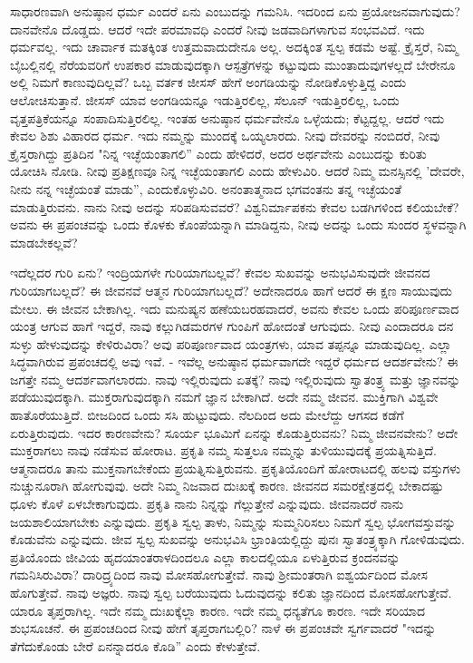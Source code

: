 ಸಾಧಾರಣವಾಗಿ ಅನುಷ್ಠಾನ ಧರ್ಮ ಎಂದರೆ ಏನು ಎಂಬುದನ್ನು ಗಮನಿಸಿ. ಇದರಿಂದ ಏನು ಪ್ರಯೋಜನವಾಗುವುದು? ದಾನವೇನೊ ದೊಡ್ಡದು. ಆದರೆ ಇದೇ ಪರಮಾವಧಿ ಎಂದರೆ ನೀವು ಜಡವಾದಿಗಳಾಗುವ ಸಂಭವವಿದೆ. ಇದು ಧರ್ಮವಲ್ಲ. ಇದು ಚಾರ್ವಾಕ ಮತಕ್ಕಿಂತ ಉತ್ತಮವಾದುದೇನೂ ಅಲ್ಲ. ಅದಕ್ಕಿಂತ ಸ್ವಲ್ಪ ಕಡಮೆ ಅಷ್ಟೆ. ಕ್ರೈಸ್ತರೆ, ನಿಮ್ಮ ಬೈಬಲ್ಲಿನಲ್ಲಿ ನೆರೆಯವರಿಗೆ ಉಪಕಾರ ಮಾಡುವುದಕ್ಕಾಗಿ ಆಸ್ಪತ್ರೆಗಳನ್ನು ಕಟ್ಟುವುದು ಮುಂತಾದುವುಗಳಲ್ಲದೆ ಬೇರೇನೂ ಅಲ್ಲಿ ನಿಮಗೆ ಕಾಣುವುದಿಲ್ಲವೆ? ಒಬ್ಬ ವರ್ತಕ ಜೀಸಸ್ ಹೇಗೆ ಅಂಗಡಿಯನ್ನು ನೋಡಿಕೊಳ್ಳುತ್ತಿದ್ದ ಎಂದು ಆಲೋಚಿಸುತ್ತಾನೆ. ಜೀಸಸ್ ಯಾವ ಅಂಗಡಿಯನ್ನೂ ಇಡುತ್ತಿರಲಿಲ್ಲ, ಸೆಲೂನ್ ಇಡುತ್ತಿರಲಿಲ್ಲ, ಒಂದು ವೃತ್ತಪತ್ರಿಕೆಯನ್ನೂ ಸಂಪಾದಿಸುತ್ತಿರಲಿಲ್ಲ. ಇಂತಹ ಅನುಷ್ಠಾನ ಧರ್ಮವೇನೊ ಒಳ್ಳೆಯದು; ಕೆಟ್ಟದ್ದಲ್ಲ. ಆದರೆ ಇದು ಕೇವಲ ಶಿಶು ವಿಹಾರದ ಧರ್ಮ. ಇದು ನಮ್ಮನ್ನು ಮುಂದಕ್ಕೆ ಒಯ್ಯಲಾರದು. ನೀವು ದೇವರನ್ನು ನಂಬಿದರೆ, ನೀವು ಕ್ರೈಸ್ತರಾಗಿದ್ದು ಪ್ರತಿದಿನ "ನಿನ್ನ ಇಚ್ಛೆಯಂತಾಗಲಿ” ಎಂದು ಹೇಳಿದರೆ, ಅದರ ಅರ್ಥವೇನು ಎಂಬುದನ್ನು ಕುರಿತು ಯೋಚಿಸಿ ನೋಡಿ. ನೀವು ಪ್ರತಿಕ್ಷಣವೂ ನಿನ್ನ ಇಚ್ಛೆಯಂತಾಗಲಿ ಎಂದು ಹೇಳುವಿರಿ. ಆದರೆ ನಿಮ್ಮ ಮನಸ್ಸಿನಲ್ಲಿ 'ದೇವರೇ, ನೀನು ನನ್ನ ಇಚ್ಛೆಯಂತೆ ಮಾಡು'', ಎಂದುಕೊಳ್ಳುವಿರಿ. ಅನಂತಾತ್ಮನಾದ ಭಗವಂತನು ತನ್ನ ಇಚ್ಛೆಯಂತೆ ಮಾಡುತ್ತಿರುವನು. ನಾನು ನೀವು ಅದನ್ನು ಸರಿಪಡಿಸುವವರೆ? ವಿಶ್ವನಿರ್ಮಾಪಕನು ಕೇವಲ ಬಡಗಿಗಳಿಂದ ಕಲಿಯಬೇಕೆ? ಅವನು ಈ ಪ್ರಪಂಚವನ್ನು ಒಂದು ಕೊಳಕು ಕೊಂಪೆಯನ್ನಾಗಿ ಮಾಡಿದ್ದನು, ನೀವು ಅದನ್ನು ಒಂದು ಸುಂದರ ಸ್ಥಳವನ್ನಾಗಿ ಮಾಡಬೇಕಲ್ಲವೆ?

ಇದೆಲ್ಲದರ ಗುರಿ ಏನು? ಇಂದ್ರಿಯಗಳೇ ಗುರಿಯಾಗಬಲ್ಲವೆ? ಕೇವಲ ಸುಖವನ್ನು ಅನುಭವಿಸುವುದೇ ಜೀವನದ ಗುರಿಯಾಗಬಲ್ಲದೆ? ಈ ಜೀವನವೆ ಆತ್ಮನ ಗುರಿಯಾಗಬಲ್ಲದೆ? ಅದೇನಾದರೂ ಹಾಗೆ ಆದರೆ ಈ ಕ್ಷಣ ಸಾಯುವುದು ಮೇಲು. ಈ ಜೀವನ ಬೇಕಾಗಿಲ್ಲ. ಇದು ಮನುಷ್ಯನ ಹಣೆಯಬರಹವಾದರೆ, ಅವನು ಕೇವಲ ಒಂದು ಪರಿಪೂರ್ಣವಾದ ಯಂತ್ರ ಆಗುವ ಹಾಗೆ ಇದ್ದರೆ, ನಾವು ಕಲ್ಲುಗಿಡಮರಗಳ ಗುಂಪಿಗೆ ಹೋದಂತೆ ಆಗುವುದು. ನೀವು ಎಂದಾದರೂ ದನ ಸುಳ್ಳು ಹೇಳುವುದನ್ನು ಕೇಳಿರುವಿರಾ? ಅವು ಪರಿಪೂರ್ಣವಾದ ಯಂತ್ರಗಳು, ಯಾವ ತಪ್ಪನ್ನೂ ಮಾಡುವುದಿಲ್ಲ. ಎಲ್ಲಾ ಸಿದ್ಧವಾಗಿರುವ ಪ್ರಪಂಚದಲ್ಲಿ ಅವು ಇವೆ. - ಇವೆಲ್ಲ ಅನುಷ್ಠಾನ ಧರ್ಮವಾಗದೇ ಇದ್ದರೆ ಧರ್ಮದ ಆದರ್ಶವೇನು? ಈ ಜಗತ್ತೇ ನಮ್ಮ ಆದರ್ಶವಾಗಲಾರದು. ನಾವು ಇಲ್ಲಿರುವುದು ಏತಕ್ಕೆ? ನಾವು ಇಲ್ಲಿರುವುದು ಸ್ವಾತಂತ್ರ್ಯ ಮತ್ತು ಜ್ಞಾನವನ್ನು ಪಡೆಯುವುದಕ್ಕಾಗಿ. ಮುಕ್ತರಾಗುವುದಕ್ಕಾಗಿ ನಮಗೆ ಜ್ಞಾನ ಬೇಕಾಗಿದೆ. ಅದೇ ನಮ್ಮ ಜೀವನ. ಮುಕ್ತಿಗಾಗಿ ವಿಶ್ವವೇ ಹಾತೊರೆಯುತ್ತಿದೆ. ಬೀಜದಿಂದ ಒಂದು ಸಸಿ ಹುಟ್ಟುವುದು. ನೆಲದಿಂದ ಅದು ಮೇಲೆದ್ದು ಆಗಸದ ಕಡೆಗೆ ಏರುತ್ತಿರುವುದು. ಇದರ ಕಾರಣವೇನು? ಸೂರ್ಯ ಭೂಮಿಗೆ ಏನನ್ನು ಕೊಡುತ್ತಿರುವನು? ನಿಮ್ಮ ಜೀವನವೇನು? ಅದೇ ಮುಕ್ತರಾಗಲು ನಾವು ನಡೆಸುವ ಹೋರಾಟ. ಪ್ರಕೃತಿ ನಮ್ಮ ಸುತ್ತಲೂ ನಮ್ಮನ್ನು ತುಳಿಯುವುದಕ್ಕೆ ಪ್ರಯತ್ನಿಸುತ್ತಿದೆ. ಆತ್ಮನಾದರೂ ತಾನು ಮುಕ್ತನಾಗಬೇಕೆಂದು ಪ್ರಯತ್ನಿಸುತ್ತಿರುವನು. ಪ್ರಕೃತಿಯೊಂದಿಗೆ ಹೋರಾಟದಲ್ಲಿ ಹಲವು ವಸ್ತುಗಳು ನುಚ್ಚುನೂರಾಗಿ ಹೋಗುವುವು. ಅದೇ ನಿಮ್ಮ ನಿಜವಾದ ದುಃಖಕ್ಕೆ ಕಾರಣ. ಜೀವನದ ಸಮರಕ್ಷೇತ್ರದಲ್ಲಿ ಬೇಕಾದಷ್ಟು ಧೂಳು ಕೊಳೆ ಏಳಬೇಕಾಗುವುದು. ಪ್ರಕೃತಿ ನಾನು ನಿನ್ನನ್ನು ಗೆಲ್ಲುತ್ತೇನೆ ಎನ್ನುವುದು. ಜೀವನಾದರೆ ನಾನು ಜಯಶಾಲಿಯಾಗಬೇಕು ಎನ್ನುವುದು. ಪ್ರಕೃತಿ ಸ್ವಲ್ಪ ತಾಳು, ನಿಮ್ಮನ್ನು ಸುಮ್ಮನಿರಿಸಲು ನಿಮಗೆ ಸ್ವಲ್ಪ ಭೋಗವಸ್ತುವನ್ನು ಕೊಡುವೆನು ಎನ್ನುವುದು. ಜೀವ ಸ್ವಲ್ಪ ಸುಖವನ್ನು ಅನುಭವಿಸಿ ಭ್ರಾಂತಿಯಲ್ಲಿದ್ದು ಪುನಃ ಸ್ವಾತಂತ್ರ್ಯಕ್ಕಾಗಿ ಗೋಳಿಡುವುದು. ಪ್ರತಿಯೊಂದು ಜೀವಿಯ ಹೃದಯಾಂತರಾಳದಿಂದಲೂ ಎಲ್ಲಾ ಕಾಲದಲ್ಲಿಯೂ ಏಳುತ್ತಿರುವ ಕ್ರಂದನವನ್ನು ಗಮನಿಸಿರುವಿರಾ? ದಾರಿದ್ರ್ಯದಿಂದ ನಾವು ಮೋಸಹೋಗುತ್ತೇವೆ. ನಾವು ಶ‍್ರೀಮಂತರಾಗಿ ಐಶ್ವರ್ಯದಿಂದ ಮೋಸ ಹೊಗುತ್ತೇವೆ. ನಾವು ಅಜ್ಞರು. ನಾವು ಸ್ವಲ್ಪ ಬರೆಯುವುದು ಓದುವುದನ್ನು ಕಲಿತು ಜ್ಞಾನದಿಂದ ಮೋಸಹೋಗುತ್ತೇವೆ. ಯಾರೂ ತೃಪ್ತರಾಗಿಲ್ಲ. ಇದೇ ನಮ್ಮ ದುಃಖಕ್ಕೆಲ್ಲಾ ಕಾರಣ. ಇದೇ ನಮ್ಮ ಧನ್ಯತೆಗೂ ಕಾರಣ. ಇದೇ ಸರಿಯಾದ ಶುಭಸೂಚನೆ. ಈ ಪ್ರಪಂಚದಿಂದ ನೀವು ಹೇಗೆ ತೃಪ್ತರಾಗಬಲ್ಲಿರಿ? ನಾಳೆ ಈ ಪ್ರಪಂಚವೇ ಸ್ವರ್ಗವಾದರೆ "ಇದನ್ನು ತೆಗೆದುಕೊಂಡು ಬೇರೆ ಏನನ್ನಾದರೂ ಕೊಡಿ'' ಎಂದು ಕೇಳುತ್ತೇವೆ.

